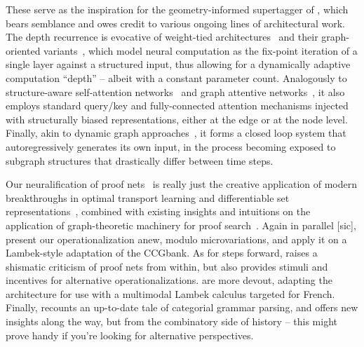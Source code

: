 These serve as the inspiration for the geometry-informed supertagger of \citet{kogkalidis2022geometryaware}, which bears semblance and owes credit to various ongoing lines of architectural work.
The depth recurrence is evocative of weight-tied architectures~\cite{dehghani2018universal,bai2019deep} and their graph-oriented variants~\cite{li2016gated}, which model neural computation as the fix-point iteration of a single layer against a structured input, thus allowing for a dynamically adaptive computation ``depth'' -- albeit with a constant parameter count.
Analogously to structure-aware self-attention networks~\cite[inter alia]{zhu-etal-2019-modeling,cai2020graph} and graph attentive networks~\cite[inter alia]{velivckovic2018graph,yun2019graph,ying2021transformers,brody2021attentive}, it also employs standard query/key and fully-connected attention mechanisms injected with structurally biased representations, either at the edge or at the node level.
Finally, akin to dynamic graph approaches~\cite{liao2019efficient,pareja2020evolvegcn}, it forms a closed loop system that autoregressively generates its own input, in the process becoming exposed to subgraph structures that drastically differ between time steps.

Our neuralification of proof nets~\cite{kogkalidis-etal-2020-neural} is really just the creative application of modern breakthroughs in optimal transport learning and differentiable set representations~\cite[inter alia]{cuturi2013sinkhorn,mena2018learning,grover2018stochastic,peyre2019computational}, combined with existing insights and intuitions on the application of graph-theoretic machinery for proof search~\cite{moot2008graph}.
Again in parallel [sic], \citet{bhargava2021proof} present our operationalization anew, modulo microvariations, and apply it on a Lambek-style adaptation of the CCGbank.
As for steps forward, \citet{moot2022perspectives} raises a shismatic criticism of proof nets from within, but also provides stimuli and incentives for alternative operationalizations.
 are more devout, adapting the architecture for use with a multimodal Lambek calculus targeted for French. 
Finally, \citet{DBLP:journals/corr/abs-2109-10044} recounts an up-to-date tale of categorial grammar parsing, and offers new insights along the way, but from the combinatory side of history -- this might prove handy if you're looking for alternative perspectives.




